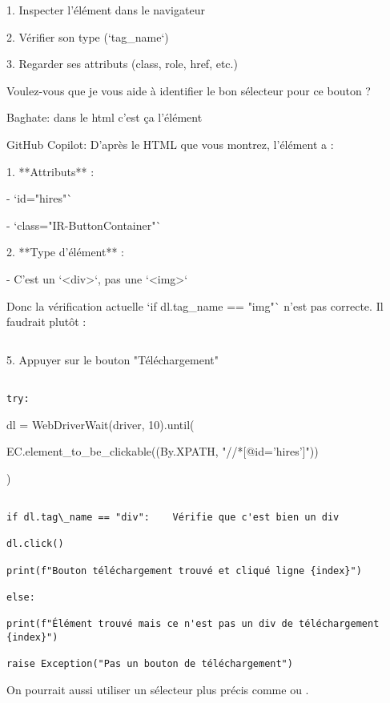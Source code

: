 1. Inspecter l'élément dans le navigateur

2. Vérifier son type (`tag\_name`)

3. Regarder ses attributs (class, role, href, etc.)

Voulez-vous que je vous aide à identifier le bon sélecteur pour ce bouton ?

Baghate: dans le html c'est ça l'élément

GitHub Copilot: D'après le HTML que vous montrez, l'élément a :

1. **Attributs** :

- `id="hires"`

- `class="IR-ButtonContainer"`

2. **Type d'élément** :

- C'est un `<div>`, pas une `<img>`

Donc la vérification actuelle `if dl.tag\_name == "img"` n'est pas correcte. Il faudrait plutôt :

\begin{verbatim}

\end{verbatim}

  5. Appuyer sur le bouton "Téléchargement"

\begin{verbatim}

try:

\end{verbatim}

dl = WebDriverWait(driver, 10).until(

EC.element\_to\_be\_clickable((By.XPATH, "//*[@id='hires']"))

)

\begin{verbatim}

if dl.tag\_name == "div":    Vérifie que c'est bien un div

dl.click()

print(f"Bouton téléchargement trouvé et cliqué ligne {index}")

else:

print(f"Élément trouvé mais ce n'est pas un div de téléchargement {index}")

raise Exception("Pas un bouton de téléchargement")

\end{verbatim}

On pourrait aussi utiliser un sélecteur plus précis comme  ou .

